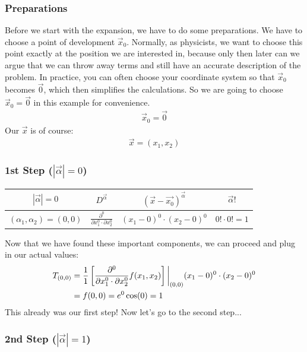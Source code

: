 \subsubsection*{Preparations}
Before we start with the expansion, we have to do some preparations. We have to choose a point of development $\vec{x}_0$. Normally, as physicists, we want to choose this point exactly at the position we are interested in, because only then later can we argue that we can throw away terms and still have an accurate description of the problem. In practice, you can often choose your coordinate system so that $\vec{x}_0$ becomes $\vec{0}$, which then simplifies the calculations. So we are going to choose $\vec{x}_0=\vec{0}$ in this example for convenience.
\begin{align}
	\vec{x}_0= \vec{0}
\end{align}
Our $\vec{x}$ is of course:
\begin{align}
	\vec{x}=(x_1, x_2)
\end{align}

\subsubsection*{1st Step ($|\vec{\alpha}|=0$)}

\begin{table}[h!]
	\centering
	\renewcommand{\arraystretch}{1.5} 
	\begin{tabular}{cccc}
		\hline
		$|\vec{\alpha}|=0$ & $D^{\vec{\alpha}}$ & $\left(\vec{x}-\vec{x_0}\right)^{\vec{\alpha}}$& $\vec{\alpha}!$\\
		\hline
		$(\alpha_1, \alpha_2)=(0, 0)$&$\frac{\partial^0}{\partial x_1^{0}\cdot \partial x_2^{0}}$& $(x_1-0)^0\cdot(x_2-0)^0$& $0!\cdot0!= 1$
	\end{tabular}
	\label{tab:taylor_example_1}
\end{table}
Now that we have found these important components, we can proceed and plug in our actual values: 
\begin{align}
	T_{(0,0)}&=\frac{1}{1}\left[\frac{\partial^0}{\partial x_1^{0}\cdot \partial x_2^{0}} f(x_1, x_2)\right]\bigg{|}_{(0,0)}(x_1-0)^0\cdot(x_2-0)^0\\
	&=f(0,0)= e^{0} \cos(0) = 1
\end{align}
This already was our first step! Now let's go to the second step...

\subsubsection*{2nd Step ($|\vec{\alpha}|=1$)}

